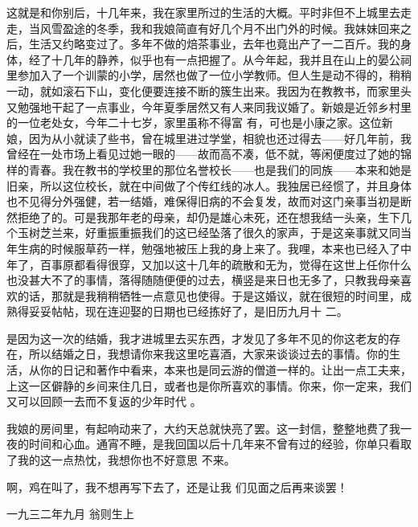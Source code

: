 \documentclass{article}
\begin{document}
这就是和你别后，十几年来，我在家里所过的生活的大概。平时非但不上城里去走走，当风雪盈途的冬季，我和我娘简直有好几个月不出门外的时候。我妹妹回来之后，生活又约略变过了。多年不做的焙茶事业，去年也竟出产了一二百斤。我的身体，经了十几年的静养，似乎也有一点把握了。从今年起，我并且在山上的晏公祠里参加入了一个训蒙的小学，居然也做了一位小学教师。但人生是动不得的，稍稍一动，就如滚石下山，变化便要连接不断的簇生出来。我因为在教教书，而家里头又勉强地干起了一点事业，今年夏季居然又有人来同我议婚了。新娘是近邻乡村里的一位老处女，今年二十七岁，家里虽称不得富
\newpage
有，可也是小康之家。这位新娘，因为从小就读了些书，曾在城里进过学堂，相貌也还过得去——好几年前，我曾经在一处市场上看见过她一眼的——故而高不凑，低不就，等闲便度过了她的锦样的青春。我在教书的学校里的那位名誉校长——也是我们的同族——本来和她是旧亲，所以这位校长，就在中间做了个传红线的冰人。我独居已经惯了，并且身体也不见得分外强健，若一结婚，难保得旧病的不会复发，故而对这门亲事当初是断然拒绝了的。可是我那年老的母亲，却仍是雄心未死，还在想我结一头亲，生下几个玉树芝兰来，好重振重振我们的这已经坠落了很久的家声，于是这亲事就又同当年生病的时候服草药一样，勉强地被压上我的身上来了。我哩，本来也已经入了中年了，百事原都看得很穿，又加以这十几年的疏散和无为，觉得在这世上任你什么也没甚大不了的事情，落得随随便便的过去，横竖是来日也无多了，只教我母亲喜欢的话，那就是我稍稍牺牲一点意见也使得。于是这婚议，就在很短的时间里，成熟得妥妥帖帖，现在连迎娶的日期也已经拣好了，是旧历九月十
二。 

\newpage

是因为这一次的结婚，我才进城里去买东西，才发见了多年不见的你这老友的存在，所以结婚之日，我想请你来我这里吃喜酒，大家来谈谈过去的事情。你的生活，从你的日记和著作中看来，本来也是同云游的僧道一样的。让出一点工夫来，上这一区僻静的乡间来住几日，或者也是你所喜欢的事情。你来，你一定来，我们又可以回顾一去而不复返的少年时代
。 

我娘的房间里，有起响动来了，大约天总就快亮了罢。这一封信，整整地费了我一夜的时间和心血。通宵不睡，是我回国以后十几年来不曾有过的经验，你单只看取了我的这一点热忱，我想你也不好意思
不来。 

啊，鸡在叫了，我不想再写下去了，还是让我
们见面之后再来谈罢！ 


一九三二年九月 翁则生上 
\end{document}
